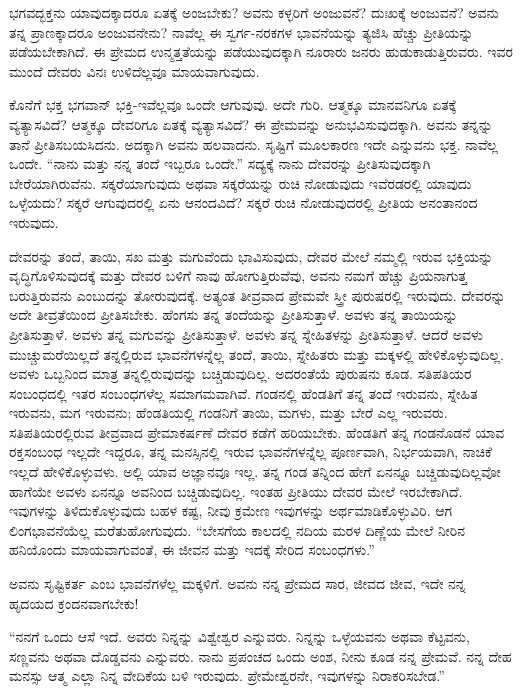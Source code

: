 ಭಗವದ್ಭಕ್ತನು ಯಾವುದಕ್ಕಾದರೂ ಏತಕ್ಕೆ ಅಂಜಬೇಕು? ಅವನು ಕಳ್ಳರಿಗೆ ಅಂಜುವನೆ? ದುಃಖಕ್ಕೆ ಅಂಜುವನೆ? ಅವನು ತನ್ನ ಪ್ರಾಣಕ್ಕಾದರೂ ಅಂಜುವನೇನು? ನಾವೆಲ್ಲ ಈ ಸ್ವರ್ಗ-ನರಕಗಳ ಭಾವನೆಯನ್ನು ತ್ಯಜಿಸಿ ಹೆಚ್ಚು ಪ್ರೀತಿಯನ್ನು ಪಡೆಯಬೇಕಾಗಿದೆ. ಈ ಪ್ರೇಮದ ಉನ್ಮತ್ತತೆಯನ್ನು ಪಡೆಯುವುದಕ್ಕಾಗಿ ನೂರಾರು ಜನರು ಹುಡುಕಾಡುತ್ತಿರುವರು. ಇವರ ಮುಂದೆ ದೇವರು ವಿನಃ ಉಳಿದೆಲ್ಲವೂ ಮಾಯವಾಗುವುದು.

ಕೊನೆಗೆ ಭಕ್ತ ಭಗವಾನ್ ಭಕ್ತಿ-ಇವೆಲ್ಲವೂ ಒಂದೇ ಆಗುವುವು. ಅದೇ ಗುರಿ. ಆತ್ಮಕ್ಕೂ ಮಾನವನಿಗೂ ಏತಕ್ಕೆ ವ್ಯತ್ಯಾಸವಿದೆ? ಆತ್ಮಕ್ಕೂ ದೇವರಿಗೂ ಏತಕ್ಕೆ ವ್ಯತ್ಯಾಸವಿದೆ? ಈ ಪ್ರೇಮವನ್ನು ಅನುಭವಿಸುವುದಕ್ಕಾಗಿ. ಅವನು ತನ್ನನ್ನು ತಾನೆ ಪ್ರೀತಿಸಬಯಸಿದನು. ಅದಕ್ಕಾಗಿ ಅವನು ಹಲವಾದನು. ಸೃಷ್ಟಿಗೆ ಮೂಲಕಾರಣ ಇದೇ ಎನ್ನುವನು ಭಕ್ತ. ನಾವೆಲ್ಲ ಒಂದೇ. “ನಾನು ಮತ್ತು ನನ್ನ ತಂದೆ ಇಬ್ಬರೂ ಒಂದೇ.” ಸದ್ಯಕ್ಕೆ ನಾನು ದೇವರನ್ನು ಪ್ರೀತಿಸುವುದಕ್ಕಾಗಿ ಬೇರೆಯಾಗಿರುವೆನು. ಸಕ್ಕರೆಯಾಗುವುದು ಅಥವಾ ಸಕ್ಕರೆಯನ್ನು ರುಚಿ ನೋಡುವುದು ಇವೆರಡರಲ್ಲಿ ಯಾವುದು ಒಳ್ಳೆಯದು? ಸಕ್ಕರೆ ಆಗುವುದರಲ್ಲಿ ಏನು ಆನಂದವಿದೆ? ಸಕ್ಕರೆ ರುಚಿ ನೋಡುವುದರಲ್ಲಿ ಪ್ರೀತಿಯ ಅನಂತಾನಂದ ಇರುವುದು.

ದೇವರನ್ನು ತಂದೆ, ತಾಯಿ, ಸಖ ಮತ್ತು ಮಗುವೆಂದು ಭಾವಿಸುವುದು, ದೇವರ ಮೇಲೆ ನಮ್ಮಲ್ಲಿ ಇರುವ ಭಕ್ತಿಯನ್ನು ವೃದ್ಧಿಗೊಳಿಸುವುದಕ್ಕೆ ಮತ್ತು ದೇವರ ಬಳಿಗೆ ನಾವು ಹೋಗುತ್ತಿರುವೆವು, ಅವನು ನಮಗೆ ಹೆಚ್ಚು ಪ್ರಿಯನಾಗುತ್ತ ಬರುತ್ತಿರುವನು ಎಂಬುದನ್ನು ತೋರುವುದಕ್ಕೆ. ಅತ್ಯಂತ ತೀವ್ರವಾದ ಪ್ರೇಮವೇ ಸ್ತ್ರೀ ಪುರುಷರಲ್ಲಿ ಇರುವುದು. ದೇವರನ್ನು ಅದೇ ತೀವ್ರತೆಯಿಂದ ಪ್ರೀತಿಸಬೇಕು. ಹೆಂಗಸು ತನ್ನ ತಂದೆಯನ್ನು ಪ್ರೀತಿಸುತ್ತಾಳೆ. ಅವಳು ತನ್ನ ತಾಯಿಯನ್ನು ಪ್ರೀತಿಸುತ್ತಾಳೆ. ಅವಳು ತನ್ನ ಮಗುವನ್ನು ಪ್ರೀತಿಸುತ್ತಾಳೆ. ಅವಳು ತನ್ನ ಸ್ನೇಹಿತಳನ್ನು ಪ್ರೀತಿಸುತ್ತಾಳೆ. ಆದರೆ ಅವಳು ಮುಚ್ಚುಮರೆಯಿಲ್ಲದೆ ತನ್ನಲ್ಲಿರುವ ಭಾವನೆಗಳನ್ನೆಲ್ಲ ತಂದೆ, ತಾಯಿ, ಸ್ನೇಹಿತರು ಮತ್ತು ಮಕ್ಕಳಲ್ಲಿ ಹೇಳಿಕೊಳ್ಳುವುದಿಲ್ಲ. ಅವಳು ಒಬ್ಬನಿಂದ ಮಾತ್ರ ತನ್ನಲ್ಲಿರುವುದನ್ನು ಬಚ್ಚಿಡುವುದಿಲ್ಲ. ಅದರಂತೆಯೆ ಪುರುಷನು ಕೂಡ. ಸತಿಪತಿಯರ ಸಂಬಂಧದಲ್ಲಿ ಇತರ ಸಂಬಂಧಗಳೆಲ್ಲ ಸಮಾಗಮವಾಗಿವೆ. ಗಂಡನಲ್ಲಿ ಹೆಂಡತಿಗೆ ತನ್ನ ತಂದೆ ಇರುವನು, ಸ್ನೇಹಿತ ಇರುವನು, ಮಗ ಇರುವನು; ಹೆಂಡತಿಯಲ್ಲಿ ಗಂಡನಿಗೆ ತಾಯಿ, ಮಗಳು, ಮತ್ತು ಬೇರೆ ಎಲ್ಲ ಇರುವರು. ಸತಿಪತಿಯರಲ್ಲಿರುವ ತೀವ್ರವಾದ ಪ್ರೇಮಾಕರ್ಷಣೆ ದೇವರ ಕಡೆಗೆ ಹರಿಯಬೇಕು. ಹೆಂಡತಿಗೆ ತನ್ನ ಗಂಡನೊಡನೆ ಯಾವ ರಕ್ತಸಂಬಂಧ ಇಲ್ಲದೇ ಇದ್ದರೂ, ತನ್ನ ಮನಸ್ಸಿನಲ್ಲಿ ಇರುವ ಭಾವನೆಗಳನ್ನೆಲ್ಲ ಪೂರ್ಣವಾಗಿ, ನಿರ್ಭಯವಾಗಿ, ನಾಚಿಕೆ ಇಲ್ಲದೆ ಹೇಳಿಕೊಳ್ಳುವಳು. ಅಲ್ಲಿ ಯಾವ ಅಜ್ಞಾನವೂ ಇಲ್ಲ. ತನ್ನ ಗಂಡ ತನ್ನಿಂದ ಹೇಗೆ ಏನನ್ನೂ ಬಚ್ಚಿಡುವುದಿಲ್ಲವೋ ಹಾಗೆಯೇ ಅವಳು ಏನನ್ನೂ ಅವನಿಂದ ಬಚ್ಚಿಡುವುದಿಲ್ಲ. ಇಂತಹ ಪ್ರೀತಿಯು ದೇವರ ಮೇಲೆ ಇರಬೇಕಾಗಿದೆ. ಇವುಗಳನ್ನು ತಿಳಿದುಕೊಳ್ಳುವುದು ಬಹಳ ಕಷ್ಟ, ನೀವು ಕ್ರಮೇಣ ಇವುಗಳನ್ನು ಅರ್ಥಮಾಡಿಕೊಳ್ಳುವಿರಿ. ಆಗ ಲಿಂಗಭಾವನೆಯೆಲ್ಲ ಮರೆತುಹೋಗುವುದು. “ಬೇಸಗೆಯ ಕಾಲದಲ್ಲಿ ನದಿಯ ಮರಳ ದಿಣ್ಣೆಯ ಮೇಲೆ ನೀರಿನ ಹನಿಯೊಂದು ಮಾಯವಾಗುವಂತೆ, ಈ ಜೀವನ ಮತ್ತು ಇದಕ್ಕೆ ಸೇರಿದ ಸಂಬಂಧಗಳು.”

ಅವನು ಸೃಷ್ಟಿಕರ್ತ ಎಂಬ ಭಾವನೆಗಳೆಲ್ಲ ಮಕ್ಕಳಿಗೆ. ಅವನು ನನ್ನ ಪ್ರೇಮದ ಸಾರ, ಜೀವದ ಜೀವ, ಇದೇ ನನ್ನ ಹೃದಯದ ಕ್ರಂದನವಾಗಬೇಕು!

“ನನಗೆ ಒಂದು ಆಸೆ ಇದೆ. ಅವರು ನಿನ್ನನ್ನು ವಿಶ್ವೇಶ್ವರ ಎನ್ನುವರು. ನಿನ್ನನ್ನು ಒಳ್ಳೆಯವನು ಅಥವಾ ಕೆಟ್ಟವನು, ಸಣ್ಣವನು ಅಥವಾ ದೊಡ್ಡವನು ಎನ್ನುವರು. ನಾನು ಪ್ರಪಂಚದ ಒಂದು ಅಂಶ, ನೀನು ಕೂಡ ನನ್ನ ಪ್ರೇಮವೆ. ನನ್ನ ದೇಹ ಮನಸ್ಸು ಆತ್ಮ ಎಲ್ಲಾ ನಿನ್ನ ವೇದಿಕೆಯ ಬಳಿ ಇರುವುದು. ಪ್ರೇಮೇಶ್ವರನೇ, ಇವುಗಳನ್ನು ನಿರಾಕರಿಸಬೇಡ.''

